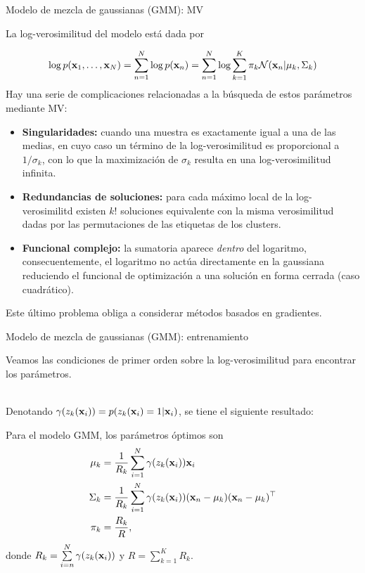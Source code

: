 \documentclass[handout, 9pt]{beamer}
\begin{document}
\begin{frame}{Modelo de mezcla de gaussianas (GMM): MV}
	
 La log-verosimilitud del modelo está dada por 

\begin{equation*}
	\log p(\mathbf{x}_1,\ldots,\mathbf{x}_N) = \sum_{n=1}^N \log p(\mathbf{x}_n) = \sum_{n=1}^N \log \sum_{k=1}^K  \pi_k{\mathcal N}(\mathbf{x}_n|\mu_k,\Sigma_k) \label{eq:GMM_like}	
\end{equation*}\pause
Hay una serie de complicaciones relacionadas a la búsqueda de estos parámetros mediante MV:

\begin{itemize}
	\item \textbf{Singularidades:} cuando una muestra es exactamente igual a una de las medias, en cuyo caso un término de la log-verosimilitud es proporcional a $1/\sigma_k$, con lo que la maximización de $\sigma_k$ resulta en una log-verosimilitud infinita.\pause
	\item \textbf{Redundancias de soluciones:} para cada máximo local de la log-verosimilitd existen $k!$ soluciones equivalente con la misma verosimilitud dadas por las permutaciones de las etiquetas de los clusters.\pause
	\item \textbf{Funcional complejo:} la sumatoria aparece \emph{dentro} del logaritmo, consecuentemente, el logaritmo no actúa directamente en la gaussiana reduciendo el funcional de optimización a una solución en forma cerrada (caso cuadrático).
\end{itemize}

Este último problema obliga a considerar métodos basados en gradientes.

\end{frame}


\begin{frame}{Modelo de mezcla de gaussianas (GMM): entrenamiento}
	
Veamos las condiciones de primer orden sobre la log-verosimilitud para encontrar los parámetros.\\~\

Denotando $\gamma(z_k(\mathbf{x}_i)) = p(z_k(\mathbf{x}_i)=1|\mathbf{x}_i)$, se tiene el siguiente resultado:

\begin{lemma} Para el modelo GMM, los parámetros óptimos son
	\begin{align*}
    \mu_k & = \frac{1}{R_k}\sum_{i=1}^N \gamma(z_k(\mathbf{x}_i))\mathbf{x}_i\\
    \Sigma_k & = \frac{1}{R_k} \sum_{i=1}^N \gamma(z_k(\mathbf{x}_i))(\mathbf{x}_n - \mu_k)(\mathbf{x}_n - \mu_k)^\top\\
    \pi_k & = \frac{R_k}{R},
    \end{align*}
    donde $R_k = \sum\limits_{i=n}^N \gamma(z_k(\mathbf{x}_i))$ y $R = \sum\limits_{k=1}^K R_k$.
\end{lemma}
	
\end{frame}
\end{document}
